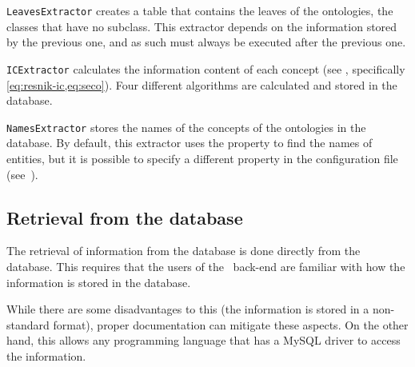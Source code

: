 \texttt{LeavesExtractor} creates a table that contains the leaves of the ontologies, \ie the classes that have no subclass. This extractor depends on the information stored by the previous one, and as such must always be executed after the previous one.

\texttt{ICExtractor} calculates the information content of each concept (see , specifically \eqref{eq:resnik-ic,eq:seco}). Four different algorithms are calculated and stored in the database.

\texttt{NamesExtractor} stores the names of the concepts of the ontologies in the database. By default, this extractor uses the property  to find the names of entities, but it is possible to specify a different property in the configuration file (see~).


\subsection{Retrieval from the database} \label{sub:owlsql/retrieval}

The retrieval of information from the database is done directly from the database. This requires that the users of the \owlsql\ back-end are familiar with how the information is stored in the database.

While there are some disadvantages to this (the information is stored in a non-standard format), proper documentation can mitigate these aspects. On the other hand, this allows any programming language that has a MySQL driver to access the information.

  
  
  
